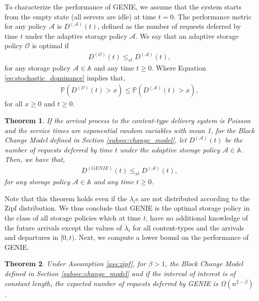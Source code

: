 \documentclass[10pt, conference, letterpaper]{IEEEtran}
\newtheorem{theorem}{Theorem}
\begin{document}
To characterize the performance of GENIE, we assume that the system
starts from the empty state (all servers are idle) at time $t=0$. The
performance metric for any policy $\mathcal{A}$ is
$D^{(\mathcal{A})}(t)$, defined as the number of requests deferred by
time $t$ under the adaptive storage policy $\mathcal{A}$.  We say that
an adaptive storage policy $\mathcal{O}$ is optimal if
\begin{eqnarray}
\label{eq:stochastic_dominance}
D^{(\mathcal{O})}(t) \leq_{st} D^{(\mathcal{A})}(t),
\end{eqnarray}
for any storage policy $\mathcal{A} \in \mathds{A}$ and any time $t \geq 0$.
Where Equation \ref{eq:stochastic_dominance} implies that,
\begin{eqnarray*}
	\mathbb{P}(D^{(\mathcal{O})}(t)>x) \leq \mathbb{P}(D^{(\mathcal{A})}(t)>x),
\end{eqnarray*}
for all $x \geq 0$ and $t \geq 0$.

\begin{theorem}
	\label{thm:stochastic_dominance}
	If the arrival process to the content-type delivery system is Poisson
	and the service times are exponential random variables with mean 1,
	for the Block Change Model defined in Section
	\ref{subsec:change_model}, let $D^{(\mathcal{A})}(t)$ be the number of
	requests deferred by time $t$ under the adaptive storage policy
	$\mathcal{A} \in \mathds{A}$. Then, we have that,
	\begin{eqnarray*}
		D^{(GENIE)}(t) \leq_{st} D^{(\mathcal{A})}(t),
	\end{eqnarray*}
	for any storage policy $\mathcal{A} \in \mathds{A}$ and any time $t \geq 0$.
\end{theorem}

Note that this theorem holds even if the $\lambda_i$s are not
distributed according to the Zipf distribution. We thus conclude that
GENIE is the optimal storage policy in the class of all storage
policies which at time $t$, have no additional knowledge of the future
arrivals except the values of $\lambda_i$ for all content-types and
the arrivals and departures in $[0, t)$. Next, we compute a lower
bound on the performance of GENIE.

\begin{theorem}
	\label{thm:GENIE_static_arrival_rates}
	Under Assumption \ref{ass:zipf}, for $\beta > 1$, the Block Change Model defined in Section \ref{subsec:change_model} and if the interval
	of interest is of constant length, the expected number of requests
	deferred by GENIE is $\Omega(n^{2-\beta})$.
\end{theorem}
\end{document}

